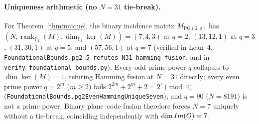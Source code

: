 \paragraph{Uniqueness arithmetic (no $N=31$ tie-break).}
For Theorem~\ref{thm:unique}, the binary incidence matrix $M_{\mathrm{PG}(2,q)}$
has $(N, \operatorname{rank}_{\mathbb{F}_2}(M), \dim_{\mathbb{F}_2}\ker(M)) =
(7,4,3)$ at $q=2$, $(13,12,1)$ at $q=3$, $(31,30,1)$ at $q=5$, and $(57,56,1)$
at $q=7$ (verified in Lean~4,
\texttt{FoundationalBounds.pg2\_5\_refutes\_N31\_hamming\_fusion}, and in
\texttt{verify\_foundational\_bounds.py}). Every odd prime power $q$ collapses
to $\dim\ker(M)=1$, refuting Hamming fusion at $N=31$ directly; every even
prime power $q=2^m$ ($m\ge 2$) fails $2^{2m}+2^m+2=2^r\pmod 4$
(\texttt{FoundationalBounds.pg2EvenHammingUniqueSeven}); and $q=90$ ($N=8191$)
is not a prime power. Binary plane--code fusion therefore forces $N=7$ uniquely
without a tie-break, coinciding independently with $\dim Im(O)=7$.
